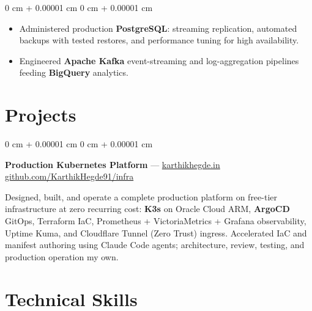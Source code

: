 \documentclass[10pt, a4paper]{article}
\newenvironment{highlights}{
    \begin{itemize}[
        topsep=0.05 cm,
        parsep=0.04 cm,
        partopsep=0pt,
        itemsep=0pt,
        leftmargin=0 cm + 10pt
    ]
}{
    \end{itemize}
} %
\newenvironment{onecolentry}{
    \begin{adjustwidth}{
        0 cm + 0.00001 cm
    }{
        0 cm + 0.00001 cm
    }
}{
    \end{adjustwidth}
} %
\let\hrefWithoutArrow\href
\begin{document}
\begin{onecolentry}
\begin{highlights}
\item Administered production \textbf{PostgreSQL}: streaming replication, automated backups with tested restores, and performance tuning for high availability.
\item Engineered \textbf{Apache Kafka} event-streaming and log-aggregation pipelines feeding \textbf{BigQuery} analytics.
\end{highlights}
\end{onecolentry}

\section{Projects}

\begin{onecolentry}
\textbf{Production Kubernetes Platform} --- \hrefWithoutArrow{https://karthikhegde.in}{karthikhegde.in} \enspace\textperiodcentered\enspace \hrefWithoutArrow{https://github.com/KarthikHegde91/infra}{github.com/KarthikHegde91/infra}

\vspace{0.05 cm}

Designed, built, and operate a complete production platform on free-tier infrastructure at zero recurring cost: \textbf{K3s} on Oracle Cloud ARM, \textbf{ArgoCD} GitOps, Terraform IaC, Prometheus + VictoriaMetrics + Grafana observability, Uptime Kuma, and Cloudflare Tunnel (Zero Trust) ingress. Accelerated IaC and manifest authoring using Claude Code agents; architecture, review, testing, and production operation my own.
\end{onecolentry}

\section{Technical Skills}
\end{document}
